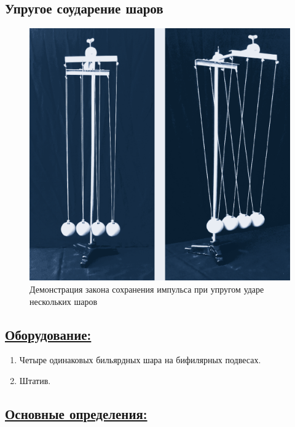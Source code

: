 \documentclass[14pt,a4paper,oneside]{extarticle}	%
\begin{document}


\begin{center}
	\subsection*{Упругое соударение шаров}
\end{center}

\begin{figure}[H]
	\centering 	
	\includegraphics[width=0.75\linewidth]{impact-1.png}
	\caption{Демонстрация закона сохранения импульса при упругом ударе нескольких шаров}
	\label{impact-1}
\end{figure}

\subsection*{\underline{Оборудование:}}

\begin{enumerate}
	\item Четыре одинаковых бильярдных шара на бифилярных подвесах.
	\item Штатив.
\end{enumerate}

\subsection*{\underline{Основные определения:}}
\end{document}
